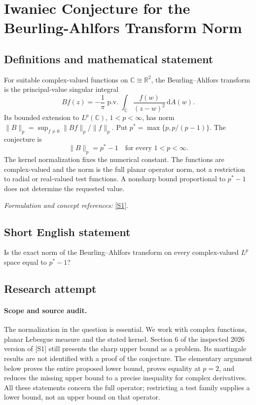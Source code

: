 \documentclass[11pt]{article}
\begin{document}
\section*{\texorpdfstring{Iwaniec Conjecture for the Beurling-Ahlfors Transform Norm}{Iwaniec Conjecture for the Beurling-Ahlfors Transform Norm}}\label{357}
\subsection{Definitions and mathematical statement}
For suitable complex-valued functions on ${\mathbb{C}}\cong{\mathbb{R}}^2$, the Beurling--Ahlfors transform is the principal-value singular integral
\[
 Bf(z)=-\frac1\pi\operatorname{p.v.}\int_{{\mathbb{C}}}
 \frac{f(w)}{(z-w)^2}{\,\mathrm{d}} A(w).
\]
Its bounded extension to $L^p({\mathbb{C}})$, $1<p<\infty$, has norm $\|B\|_p=\sup_{f\ne0}\|Bf\|_p/\|f\|_p$. Put $p^*=\max\{p,p/(p-1)\}$. The conjecture is
\[
 \|B\|_p=p^*-1\quad\text{for every }1<p<\infty.
\]
The kernel normalization fixes the numerical constant. The functions are complex-valued and the norm is the full planar operator norm, not a restriction to radial or real-valued test functions. A nonsharp bound proportional to $p^*-1$ does not determine the requested value.
\par\smallskip\textit{Formulation and concept references:} \href{https://arxiv.org/html/2604.09365v2#S6}{[S1]}.

\subsection{Short English statement}
Is the exact norm of the Beurling--Ahlfors transform on every complex-valued $L^p$ space equal to $p^*-1$?
\subsection{Research attempt}
\paragraph{Scope and source audit.}
The normalization in the question is essential. We work with complex
functions, planar Lebesgue measure and the stated kernel. Section 6 of
the inspected 2026 version of [S1] still presents the sharp upper
bound as a problem. Its martingale results are not identified with a
proof of the conjecture. The elementary argument below proves the
entire proposed lower bound, proves equality at $p=2$, and reduces
the missing upper bound to a precise inequality for complex derivatives.
All these statements concern the full operator; restricting a test
family supplies a lower bound, not an upper bound on that operator.
\end{document}
